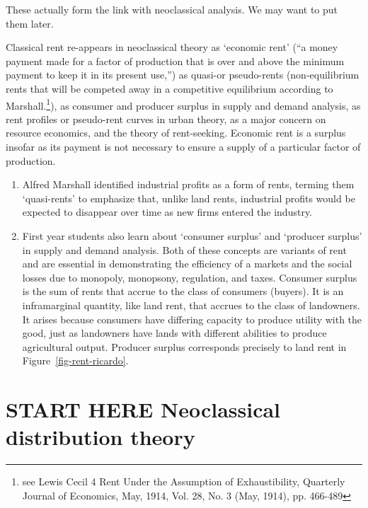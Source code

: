
These actually form the link with neoclassical analysis. We may want to put them later.

Classical rent re-appears in neoclassical theory as `economic rent' (``a money payment made for a factor of production that is over and above the minimum payment to keep it in its present use,'')  as quasi-or pseudo-rents (non-equilibrium rents that will be competed away in a competitive equilibrium according to Marshall.\footnote{see Lewis Cecil 4 Rent Under the Assumption of Exhaustibility, Quarterly Journal of Economics, May, 1914, Vol. 28, No. 3 (May, 1914), pp. 466-489}),  as consumer  and producer surplus in supply and demand analysis,  as rent profiles or \gls{pseudo-rent} curves in urban theory, as a major concern on resource economics, and the theory of rent-seeking. Economic rent is a surplus insofar as its payment is not necessary to ensure a supply of a particular factor of production. 

\begin{enumerate}
    \item Alfred Marshall identified industrial profits as a form of rents, terming them `quasi-rents' to emphasize that, unlike land rents, industrial profits would be expected to disappear over time as new firms entered the industry.
    
    \item First year students also learn about `consumer surplus' and `producer surplus' in supply and demand analysis. Both of these concepts are variants of rent and are essential in demonstrating the efficiency of a markets and the social losses due to \gls{monopoly}, \gls{monopsony}, regulation, and taxes. Consumer surplus is the sum of rents that accrue to the class of consumers (buyers). It is an \gls{inframarginal} quantity, like land  rent, that accrues to the class of landowners. It arises because consumers have differing capacity to produce  utility with the good, just as landowners have lands with different abilities to produce agricultural output. Producer surplus corresponds precisely to land rent in Figure~\ref{fig-rent-ricardo}.  
\end{enumerate}



\section{START HERE Neoclassical distribution theory}
% 
  
